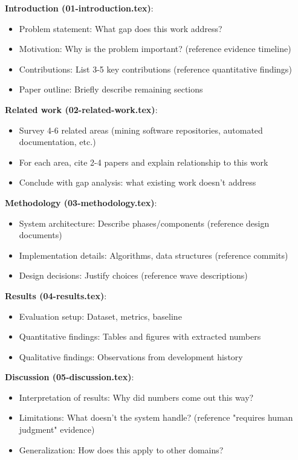 \textbf{Introduction (01-introduction.tex)}:
\begin{itemize}
\item Problem statement: What gap does this work address?
\item Motivation: Why is the problem important? (reference evidence timeline)
\item Contributions: List 3-5 key contributions (reference quantitative findings)
\item Paper outline: Briefly describe remaining sections
\end{itemize}

\textbf{Related work (02-related-work.tex)}:
\begin{itemize}
\item Survey 4-6 related areas (mining software repositories, automated documentation, etc.)
\item For each area, cite 2-4 papers and explain relationship to this work
\item Conclude with gap analysis: what existing work doesn't address
\end{itemize}

\textbf{Methodology (03-methodology.tex)}:
\begin{itemize}
\item System architecture: Describe phases/components (reference design documents)
\item Implementation details: Algorithms, data structures (reference commits)
\item Design decisions: Justify choices (reference wave descriptions)
\end{itemize}

\textbf{Results (04-results.tex)}:
\begin{itemize}
\item Evaluation setup: Dataset, metrics, baseline
\item Quantitative findings: Tables and figures with extracted numbers
\item Qualitative findings: Observations from development history
\end{itemize}

\textbf{Discussion (05-discussion.tex)}:
\begin{itemize}
\item Interpretation of results: Why did numbers come out this way?
\item Limitations: What doesn't the system handle? (reference "requires human judgment" evidence)
\item Generalization: How does this apply to other domains?
\end{itemize}


